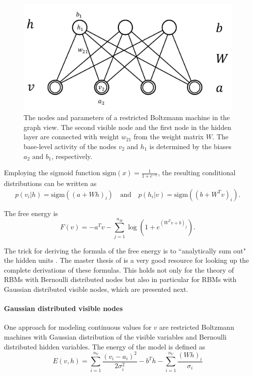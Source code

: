 \documentclass[12pt]{article}
\newcommand{\sigm}{\mathrm{sigm}}
\begin{document}
\begin{figure}[h]
   \centering
   \includegraphics[scale=0.5]{images/rbmweights.pdf}
   \caption{The nodes and parameters of a restricted Boltzmann machine in the graph view. The second visible node and the first node in the hidden layer are connected with weight $w_{21}$ from the weight matrix $W$. The base-level activity of the nodes $v_2$ and $h_1$ is determined by the biases $a_2$ and $b_1$, respectively.}
   \label{fig:rbmweights}
 \end{figure}


Employing the sigmoid function $\sigm(x) = \frac{1}{1+ e^{-x}}$, the resulting conditional distributions can be written as
\begin{equation}
p(v_i | h) = \sigm ((a + W h)_i)
 \quad \text{and}\quad
p(h_i | v) = \sigm ((b + W^T v)_i).
\label{eqn:condprobrbm}
\end{equation}

The free energy is
\begin{equation}
F(v) = - a^T v - \sum_{j=1}^{n_H} \log \left (1 + e^{(W^T v + b)_j}\right).
\label{eqn:freenergy_rbm}
\end{equation}

The trick for deriving the formula of the free energy is to ``analytically sum out" the hidden units \citep{sala2012anefficient}.
The master thesis of \cite{krizhevsky2009tinyimagesthesis} is a very good resource for looking up the complete derivations of these formulas. This holds not only for the theory of RBMs with Bernoulli distributed nodes but also in particular for RBMs with Gaussian distributed visible nodes, which are presented next.

\paragraph{Gaussian distributed visible nodes}\label{gaussianrbm}
One approach for modeling continuous values for $v$ are restricted Boltzmann machines with Gaussian distribution of the visible variables and Bernoulli distributed hidden variables. The energy of the model is defined as
\begin{equation}
   E(v,h) = \sum_{i=1}^{n_V}\frac{(v_i - a_i)^2}{2\sigma_i^2} - b^T h - \sum_{i=1}^{n_V} \frac{(Wh)_i}{\sigma_i}
   \label{eqn:energyformulagbrbm}
\end{equation}
\end{document}
